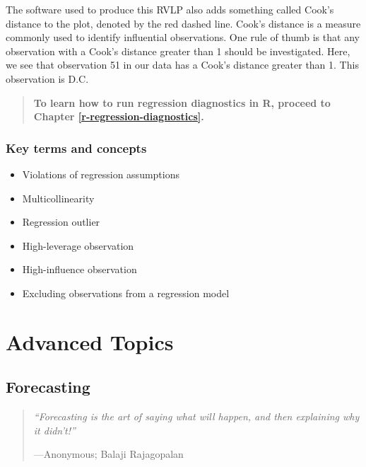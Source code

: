 \documentclass[
]{book}
\providecommand{\tightlist}{%
  \setlength{\itemsep}{0pt}\setlength{\parskip}{0pt}}
\newenvironment{learncheck}%
{%
  \par\vspace{\baselineskip}\noindent 
  \color{Exercise}\begin{itshape}%
  \par\vspace{\baselineskip}\noindent\ignorespaces 
}%
{%
  \end{itshape}\ignorespacesafterend 
}
\begin{document}
The software used to produce this RVLP also adds something called Cook's distance to the plot, denoted by the red dashed line. Cook's distance is a measure commonly used to identify influential observations. One rule of thumb is that any observation with a Cook's distance greater than 1 should be investigated. Here, we see that observation 51 in our data has a Cook's distance greater than 1. This observation is D.C.

\begin{quote}
\textbf{To learn how to run regression diagnostics in R, proceed to Chapter \ref{r-regression-diagnostics}.}
\end{quote}

\hypertarget{kt13}{%
\section{Key terms and concepts}\label{kt13}}

\begin{learncheck}
\begin{itemize}
\tightlist
\item
  Violations of regression assumptions
\item
  Multicollinearity
\item
  Regression outlier
\item
  High-leverage observation
\item
  High-influence observation
\item
  Excluding observations from a regression model
\end{itemize}
\end{learncheck}

\hypertarget{part-advanced-topics}{%
\part{Advanced Topics}\label{part-advanced-topics}}

\hypertarget{forecasting}{%
\chapter{Forecasting}\label{forecasting}}

\begin{quote}
\emph{``Forecasting is the art of saying what will happen, and then explaining why it didn't!''}

---Anonymous; Balaji Rajagopalan
\end{quote}
\end{document}
